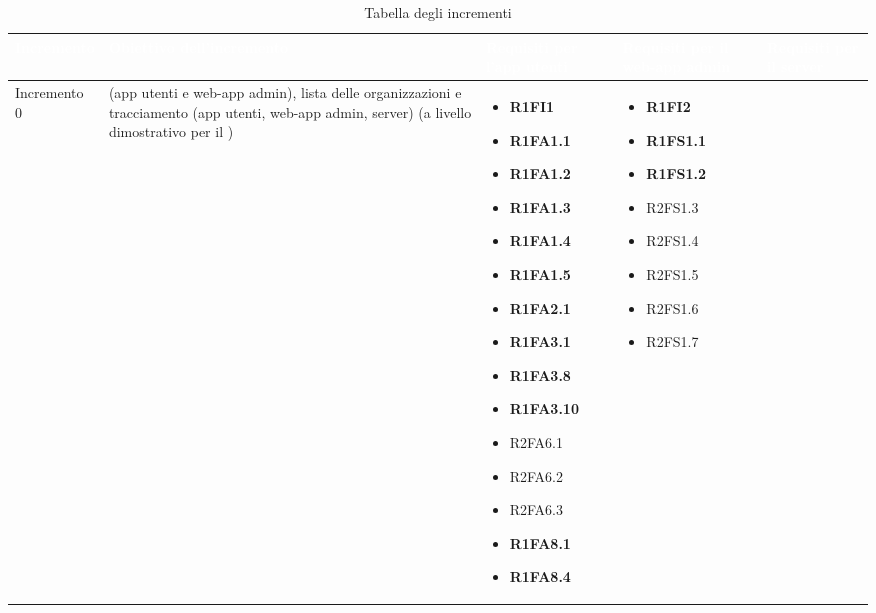 {
\renewcommand{\arraystretch}{2}
\centering
	
\begin{longtable}{C{2.5cm} C{3.2cm} C{2.8cm} C{2.8cm} C{2.8cm}}
\caption{Tabella degli incrementi}\\
\textcolor{white}{\textbf{Incremento}} &
\textcolor{white}{\textbf{Obiettivo dell'incremento}} & 
\textcolor{white}{\textbf{Requisiti per l'app utenti}} &
\textcolor{white}{\textbf{Requisiti per il web-app admin}} &
\textcolor{white}{\textbf{Requisiti per il server}} \\
\endhead

Incremento 0 &  (app utenti e web-app admin), lista delle organizzazioni e tracciamento (app utenti, web-app admin, server) (a livello dimostrativo per il ) & \begin{itemize}
    \item[ ] \textbf{R1FI1}
    \item[ ] \textbf{R1FA1.1}
    \item[ ] \textbf{R1FA1.2}
    \item[ ] \textbf{R1FA1.3}
    \item[ ] \textbf{R1FA1.4}
    \item[ ] \textbf{R1FA1.5}
    \item[ ] \textbf{R1FA2.1}
    \item[ ] \textbf{R1FA3.1}
    \item[ ] \textbf{R1FA3.8}
    \item[ ] \textbf{R1FA3.10}
    \item[ ] R2FA6.1
    \item[ ] R2FA6.2
    \item[ ] R2FA6.3
    \item[ ] \textbf{R1FA8.1}
    \item[ ] \textbf{R1FA8.4} 
\end{itemize} & \begin{itemize}
    \item[ ] \textbf{R1FI2}
    \item[ ] \textbf{R1FS1.1}
    \item[ ] \textbf{R1FS1.2}
    \item[ ] R2FS1.3
    \item[ ] R2FS1.4
    \item[ ] R2FS1.5
    \item[ ] R2FS1.6
    \item[ ] R2FS1.7

\end{itemize}
\end{longtable}}
